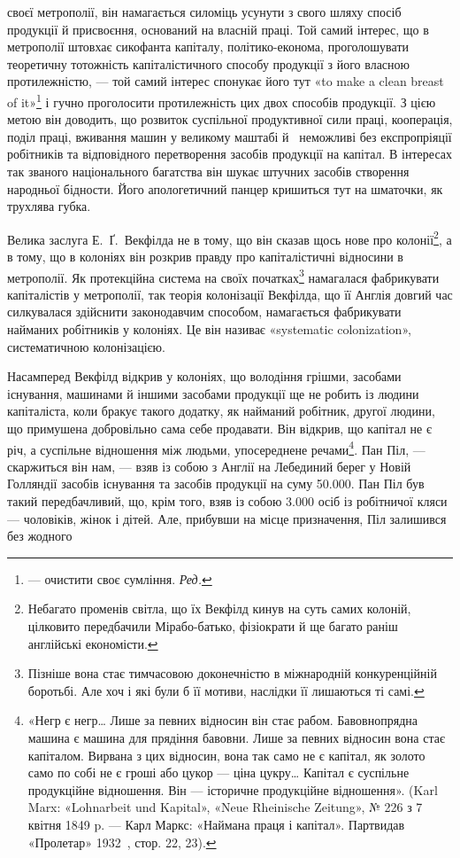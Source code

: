\parcont{}  %
своєї метрополії, він намагається силоміць усунути з свого шляху спосіб продукції й присвоєння,
оснований на власній праці. Той самий інтерес, що в метрополії штовхає сикофанта капіталу,
політико-економа, проголошувати теоретичну тотожність капіталістичного способу продукції з його
власною протилежністю, — той самий інтерес спонукає його тут «to make a clean breast of it»\footnote*{
— очистити своє сумління. \emph{Ред.}
} і гучно
проголосити протилежність цих двох способів продукції. З цією метою він доводить, що розвиток
суспільної продуктивної сили праці, кооперація, поділ праці, вживання машин у великому маштабі й~ неможливі без експропріяції робітників та відповідного перетворення засобів продукції на
капітал. В інтересах так званого національного багатства він шукає штучних засобів створення
народньої бідности. Його апологетичний панцер кришиться тут на шматочки, як трухлява губка.

Велика заслуга Е.~Ґ.~Векфілда не в тому, що він сказав щось нове про колонії\footnote{
Небагато променів світла, що їх Векфілд кинув на суть самих колоній, цілковито передбачили
Мірабо-батько, фізіократи й ще багато раніш англійські економісти.
}, а в тому, що в
колоніях він розкрив правду про капіталістичні відносини в метрополії. Як протекційна система на
своїх початках\footnote{
Пізніше вона стає тимчасовою доконечністю в міжнародній конкуренційній боротьбі. Але хоч і які
були б її мотиви, наслідки її лишаються ті самі.
} намагалася фабрикувати капіталістів
у метрополії, так теорія колонізації Векфілда, що її Англія довгий час силкувалася здійснити
законодавчим способом, намагається фабрикувати найманих робітників у колоніях. Це він називає
«systematic colonization», систематичною колонізацією.

Насамперед Векфілд відкрив у колоніях, що володіння грішми, засобами існування, машинами й іншими
засобами продукції ще не робить із людини капіталіста, коли бракує такого додатку, як найманий
робітник, другої людини, що примушена добровільно сама себе продавати. Він відкрив, що капітал не є
річ, а суспільне відношення між людьми, упосереднене речами\footnote{
«Негр є негр\dots{} Лише за певних відносин він стає рабом. Бавовнопрядна машина є машина для
прядіння бавовни. Лише за певних відносин вона стає капіталом. Вирвана з цих відносин, вона так само
не є капітал, як золото само по собі не є гроші або цукор — ціна цукру\dots{} Капітал є суспільне
продукційне відношення. Він — історичне продукційне відношення». (Karl Marx: «Lohnarbeit und
Kapital», «Neue Rheinische Zeitung», № 226 з 7 квітня 1849 p. — Карл Маркс: «Наймана праця і
капітал». Партвидав «Пролетар» 1932~, стор. 22, 23).
}. Пан Піл, — скаржиться він нам, —
взяв із собою з Англії на Лебединий берег у Новій Голляндії засобів існування та засобів продукції
на суму \num{50.000}. Пан Піл був такий передбачливий, що, крім того, взяв із собою
\num{3.000} осіб із робітничої кляси — чоловіків, жінок і дітей. Але, прибувши на місце призначення, Піл
залишився без жодного
\parbreak{}  %
